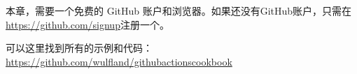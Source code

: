 本章，需要一个免费的 GitHub 账户和浏览器。如果还没有GitHub账户，只需在\url{https://github.com/signup}注册一个。

可以这里找到所有的示例和代码：\url{https://github.com/wulfland/githubactionscookbook}